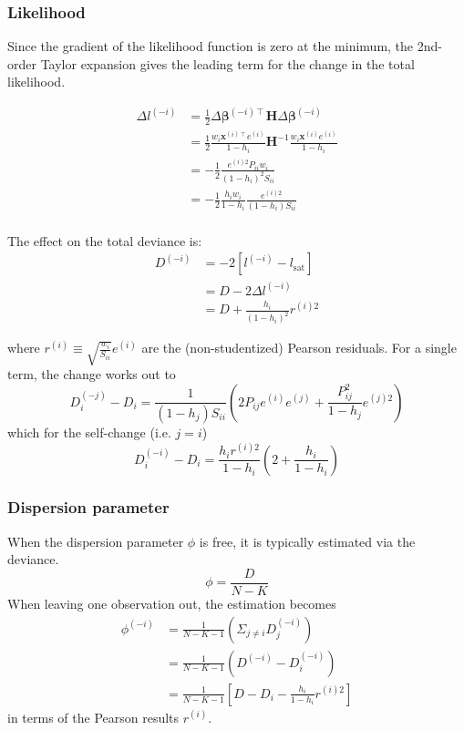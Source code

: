 \documentclass{article}
\newcommand{\bbeta}{\boldsymbol{\beta}}
\begin{document}
\subsubsection{Likelihood}

Since the gradient of the likelihood function is zero at the minimum, the
2nd-order Taylor expansion gives the leading term for the change in the
total likelihood.

\begin{align}
\Delta l^{(-i)} &= \frac{1}{2} \Delta \bbeta^{(-i)\intercal} \mathbf{H} \Delta\bbeta^{(-i)} \\\
&= \frac{1}{2} \frac{w_i \mathbf{x}^{(i)\intercal} e^{(i)}}{1 - h_{i}} \mathbf{H}^{-1} \frac{w_i \mathbf{x}^{(i)} e^{(i)}}{1 - h_{i}} \\\
&= -\frac{1}{2} \frac{e^{(i)2} P_{ii} w_i}{(1-h_i)^2 S_{ii}} \\\
&= -\frac{1}{2} \frac{h_i w_i}{1-h_i} \frac{e^{(i)2}}{(1-h_i)S_{ii}} \\\
\end{align}

The effect on the total deviance is:
\begin{align}
D^{(-i)} &= -2 \left[ l^{(-i)} - l_\textrm{sat} \right] \\\
&= D - 2 \Delta l^{(-i)} \\\
&= D + \frac{h_i}{(1-h_i)^2} r^{(i)2}
\end{align}

where \( r^{(i)} \equiv \sqrt{\frac{w_i}{S_{ii}}}e^{(i)} \) are the (non-studentized) Pearson residuals. For a single term, the change works out to
\[ D_i^{(-j)} - D_i = \frac{1}{(1-h_j)S_{ii}} \left( 2P_{ij} e^{(i)} e^{(j)} + \frac{P_{ij}^2}{1 - h_j} e^{(j)2} \right) \]
which for the self-change (i.e. \( j = i\))
\[ D_i^{(-i)} - D_i = \frac{h_i r^{(i)2}}{1-h_i} \left( 2  + \frac{h_i}{1 - h_i}\right) \]

\subsubsection{Dispersion parameter}

When the dispersion parameter \(\phi\) is free, it is typically estimated via the deviance.
\[ \phi = \frac{D}{N - K} \]
When leaving one observation out, the estimation becomes
\begin{align}
  \phi^{(-i)} &= \frac{1}{N - K - 1} \left( \Sigma_{j\neq i} D_{j}^{(-i)} \right) \\
              &= \frac{1}{N - K - 1} \left( D^{(-i)} - D_{i}^{(-i)} \right) \\
              &= \frac{1}{N - K - 1} \left[ D - D_i - \frac{h_i}{1-h_i} r^{(i)2} \right]
\end{align}
in terms of the Pearson results $r^{(i)}$.
\end{document}
